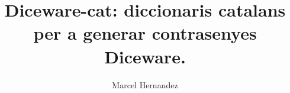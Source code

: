 \documentclass[a4paper,11pt]{article}
\title{Diceware-cat: diccionaris catalans per a generar contrasenyes Diceware.}
\author{Marcel Hernandez}
\begin{document}
\maketitle

\begin{multicols}{5}
  
\end{multicols}
\end{document}
